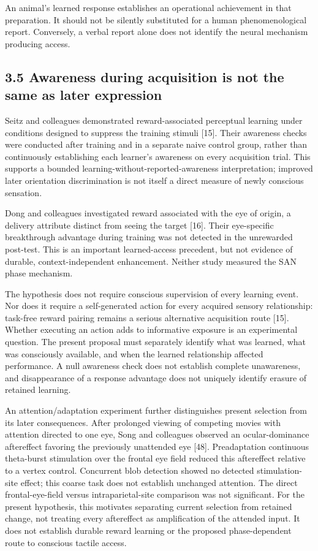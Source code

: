 \documentclass[
  american,
  11pt,
  letterpaper,
]{article}
\begin{document}
An animal's learned response establishes an operational achievement in that preparation. It should not be silently substituted for a human phenomenological report. Conversely, a verbal report alone does not identify the neural mechanism producing access.

\subsection{3.5 Awareness during acquisition is not the same as later expression}\label{awareness-during-acquisition-is-not-the-same-as-later-expression}

Seitz and colleagues demonstrated reward-associated perceptual learning under conditions designed to suppress the training stimuli {[}15{]}. Their awareness checks were conducted after training and in a separate naive control group, rather than continuously establishing each learner's awareness on every acquisition trial. This supports a bounded learning-without-reported-awareness interpretation; improved later orientation discrimination is not itself a direct measure of newly conscious sensation.

Dong and colleagues investigated reward associated with the eye of origin, a delivery attribute distinct from seeing the target {[}16{]}. Their eye-specific breakthrough advantage during training was not detected in the unrewarded post-test. This is an important learned-access precedent, but not evidence of durable, context-independent enhancement. Neither study measured the SAN phase mechanism.

The hypothesis does not require conscious supervision of every learning event. Nor does it require a self-generated action for every acquired sensory relationship: task-free reward pairing remains a serious alternative acquisition route {[}15{]}. Whether executing an action adds to informative exposure is an experimental question. The present proposal must separately identify what was learned, what was consciously available, and when the learned relationship affected performance. A null awareness check does not establish complete unawareness, and disappearance of a response advantage does not uniquely identify erasure of retained learning.

An attention/adaptation experiment further distinguishes present selection from its later consequences. After prolonged viewing of competing movies with attention directed to one eye, Song and colleagues observed an ocular-dominance aftereffect favoring the previously unattended eye {[}48{]}. Preadaptation continuous theta-burst stimulation over the frontal eye field reduced this aftereffect relative to a vertex control. Concurrent blob detection showed no detected stimulation-site effect; this coarse task does not establish unchanged attention. The direct frontal-eye-field versus intraparietal-site comparison was not significant. For the present hypothesis, this motivates separating current selection from retained change, not treating every aftereffect as amplification of the attended input. It does not establish durable reward learning or the proposed phase-dependent route to conscious tactile access.
\end{document}

